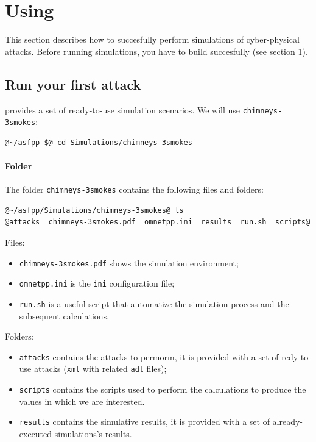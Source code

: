 
\section{Using \asf}
\label{chap:using-asfpp}
This section describes how to succesfully perform simulations of cyber-physical attacks. Before running simulations, you have to build \asf succesfully (see section 1).

\subsection{Run your first attack}

\asf provides a set of ready-to-use simulation scenarios. We will use \texttt{chimneys-3smokes}:
%
\begin{lstlisting}[language={terminal}]
@~/asfpp $@ cd Simulations/chimneys-3smokes
\end{lstlisting}


\paragraph{Folder}
The folder \texttt{chimneys-3smokes} contains the following files and folders:
%
\begin{lstlisting}[language={terminal}]
@~/asfpp/Simulations/chimneys-3smokes@ ls
@attacks  chimneys-3smokes.pdf  omnetpp.ini  results  run.sh  scripts@
\end{lstlisting}
%
Files:
%
\begin{itemize}
\item \texttt{chimneys-3smokes.pdf} shows the simulation environment;
\item \texttt{omnetpp.ini} is the \texttt{ini} configuration file;
\item \texttt{run.sh} is a useful script that automatize the simulation process and the subsequent calculations.
\end{itemize}

Folders:
\begin{itemize}
\item \texttt{attacks} contains the attacks to permorm, it is provided with a set of redy-to-use attacks (\texttt{xml} with related \texttt{adl} files);
\item \texttt{scripts} contains the scripts used to perform the calculations to produce the values in which we are interested.
\item \texttt{results} contains the simulative results, it is provided with a set of already-executed simulations's results. 
\end{itemize}



